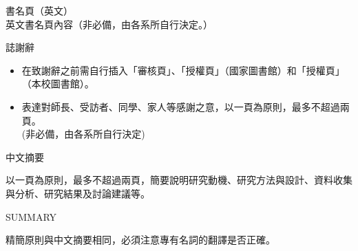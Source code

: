 \documentclass[12pt,oneside,openany,a4paper]{book}
\begin{document}
\pagestyle{plain}
\parindent=0.8cm

\newpage
\thispagestyle{empty}


\newpage
\thispagestyle{empty}
\begin{center}
\end{center}

\newpage
\thispagestyle{empty}


\newpage
\thispagestyle{empty}
\noindent 書名頁（英文）\\
英文書名頁內容（非必備，由各系所自行決定。）

\newpage
\thispagestyle{empty}
\begin{center}
    {\LARGE{誌謝辭}}
\end{center}
\begin{itemize}
    \item 在致謝辭之前需自行插入「審核頁」、「授權頁」（國家圖書館）和「授權頁」（本校圖書館）。
    \item 表達對師長、受訪者、同學、家人等感謝之意，以一頁為原則，最多不超過兩頁。\\
          (非必備，由各系所自行決定)
\end{itemize}

\frontmatter
\begin{center}
    {\LARGE{中文摘要}}
\end{center}
以一頁為原則，最多不超過兩頁，簡要說明研究動機、研究方法與設計、資料收集與分析、研究結果及討論建議等。

\newpage
\begin{center}
    {\LARGE SUMMARY}
\end{center}
精簡原則與中文摘要相同，必須注意專有名詞的翻譯是否正確。

\newpage
\tableofcontents

\newpage
\listoftables
\listoffigures

\mainmatter







\backmatter



\appendix

\end{document}

